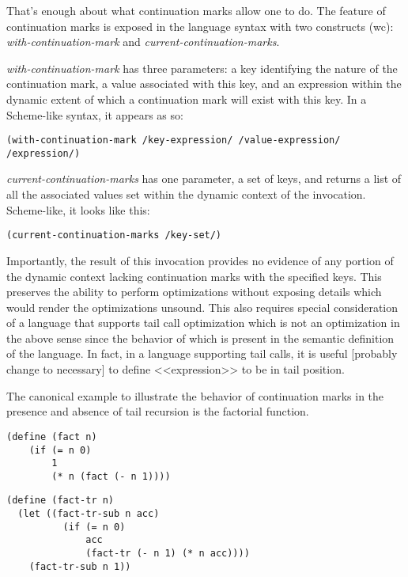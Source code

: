 \documentclass[ms]{byuprop}
\begin{document}
That's enough about what continuation marks allow one to do. The feature of continuation marks is exposed in the language syntax with two constructs (wc): \emph{with-continuation-mark} and \emph{current-continuation-marks}.

\emph{with-continuation-mark} has three parameters: a key identifying the nature of the continuation mark, a value associated with this key, and an expression within the dynamic extent of which a continuation mark will exist with this key. In a Scheme-like syntax, it appears as so:

\begin{verbatim}
(with-continuation-mark /key-expression/ /value-expression/ /expression/)
\end{verbatim}

\emph{current-continuation-marks} has one parameter, a set of keys, and returns a list of all the associated values set within the dynamic context of the invocation. Scheme-like, it looks like this:

\begin{verbatim}
(current-continuation-marks /key-set/)
\end{verbatim}

Importantly, the result of this invocation provides no evidence of any portion of the dynamic context lacking continuation marks with the specified keys. This preserves the ability to perform optimizations without exposing details which would render the optimizations unsound. This also requires special consideration of a language that supports tail call optimization which is not an optimization in the above sense since the behavior of which is present in the semantic definition of the language. In fact, in a language supporting tail calls, it is useful [probably change to necessary] to define <<expression>> to be in tail position.

The canonical example to illustrate the behavior of continuation marks in the presence and absence of tail recursion is the factorial function.

\begin{verbatim}
(define (fact n)
    (if (= n 0)
        1
        (* n (fact (- n 1))))
\end{verbatim}

\begin{verbatim}
(define (fact-tr n)
  (let ((fact-tr-sub n acc)
          (if (= n 0)
              acc
              (fact-tr (- n 1) (* n acc))))
    (fact-tr-sub n 1))
\end{verbatim}
\end{document}
